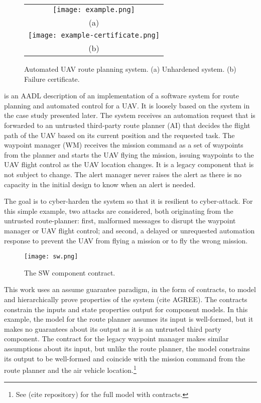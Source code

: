 \begin{figure*}
  \begin{center}
    \begin{tabular}{c}
      \texttt{[image: example.png]} \\
      (a) \\
      \texttt{[image: example-certificate.png]} \\
      (b)
    \end{tabular}
  \end{center}
\caption{Automated UAV route planning system. (a) Unhardened system. (b) Failure certificate.}
\label{fig:example}
\end{figure*}

 is an AADL description of an implementation of a software system for route planning and automated control for a UAV. It is loosely based on the system in the case study presented later. The system receives an automation request that is forwarded to an untrusted third-party route planner (AI) that decides the flight path of the UAV based on its current position and the requested task. The waypoint manager (WM) receives the mission command as a set of waypoints from the planner and starts the UAV flying the mission, issuing waypoints to the UAV flight control as the UAV location changes. It is a legacy component that is not subject to change. The alert manager never raises the alert as there is no capacity in the initial design to know when an alert is needed.

The goal is to cyber-harden the system so that it is resilient to cyber-attack. For this simple example, two attacks are considered, both originating from the untrusted route-planner: first, malformed messages to disrupt the waypoint manager or UAV flight control; and second, a delayed or unrequested automation response to prevent the UAV from flying a mission or to fly the wrong mission.

\begin{figure}
  \begin{center}
    \texttt{[image: sw.png]}
  \end{center}
  \caption{The SW component contract.}
  \label{fig:sw}
\end{figure}

This work uses an assume guarantee paradigm, in the form of contracts, to model and hierarchically prove properties of the system (cite AGREE). The contracts constrain the inputs and state properties output for component models. In this example, the model for the route planner assumes its input is well-formed, but it makes no guarantees about its output as it is an untrusted third party component. The contract for the legacy waypoint manager makes similar assumptions about its input, but unlike the route planner, the model constrains its output to be well-formed and coincide with the mission command from the route planner and the air vehicle location.\footnote{See (cite repository) for the full model with contracts.}

